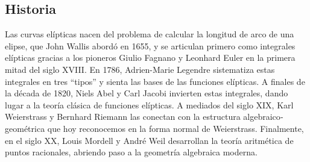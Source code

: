 \subsection{Historia}\label{sec:historia_curvas_elipticas}
Las curvas elípticas nacen del problema de calcular la longitud de arco de una elipse, que John Wallis abordó en 1655, y se articulan primero como integrales elípticas gracias a los pioneros Giulio Fagnano y Leonhard Euler en la primera mitad del siglo XVIII. En 1786, Adrien-Marie Legendre sistematiza estas integrales en tres “tipos” y sienta las bases de las funciones elípticas. A finales de la década de 1820, Niels Abel y Carl Jacobi invierten estas integrales, dando lugar a la teoría clásica de funciones elípticas. A mediados del siglo XIX, Karl Weierstrass y Bernhard Riemann las conectan con la estructura algebraico‐geométrica que hoy reconocemos en la forma normal de Weierstrass. 
Finalmente, en el siglo XX, Louis Mordell y André Weil desarrollan la teoría aritmética de puntos racionales, abriendo paso a la geometría algebraica moderna.

